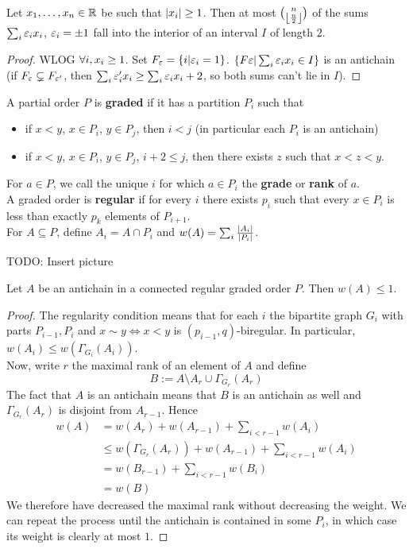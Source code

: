 \documentclass{article}
\begin{document}
\begin{ncor}
  Let $x_1, \dots, x_n \in \mathbb R$ be such that $\left\lvert x_i\right\rvert \ge 1$. Then at most $\binom n{\left\lfloor \frac n 2\right\rfloor}$ of the sums $\sum_i \varepsilon_i x_i$, $\varepsilon_i = \pm 1$ fall into the interior of an interval $I$ of length $2$.
\end{ncor}
\begin{proof}
  WLOG $\forall i, x_i \ge 1$. Set $F_\varepsilon = \{i | \varepsilon_i = 1\}$. $\{F\varepsilon | \sum_i \varepsilon_i x_i \in I\}$ is an antichain (if $F_\varepsilon \subsetneq F_{\varepsilon'}$, then $\sum_i \varepsilon'_i x_i \ge \sum_i \varepsilon_i x_i + 2$, so both sums can't lie in $I$).
\end{proof}

\begin{defi}
  A partial order $P$ is {\bf graded} if it has a partition $P_i$ such that
  \begin{itemize}
    \item if $x < y$, $x \in P_i$, $y \in P_j$, then $i < j$ (in particular each $P_i$ is an antichain)
    \item if $x < y$, $x \in P_i$, $y \in P_j$, $i + 2 \le j$, then there exists $z$ such that $x < z < y$.
  \end{itemize}
  For $a \in P$, we call the unique $i$ for which $a \in P_i$ the {\bf grade} or {\bf rank} of $a$. \\
  A graded order is {\bf regular} if for every $i$ there exists $p_i$ such that every $x \in P_i$ is less than exactly $p_k$ elements of $P_{i + 1}$. \\
  For $A \subseteq P$, define $A_i = A \cap P_i$ and $w(A) = \sum_i \frac{\left\lvert A_i\right\rvert}{\left\lvert P_i\right\rvert}$.
\end{defi}

TODO: Insert picture

\begin{nthm}
  Let $A$ be an antichain in a connected regular graded order $P$. Then $w(A) \le 1$.
\end{nthm}
\begin{proof}
  The regularity condition means that for each $i$ the bipartite graph $G_i$ with parts $P_{i - 1}, P_i$ and $x \sim y \iff x < y$ is $(p_{i - 1}, q)$-biregular. In particular, $w(A_i) \le w(\Gamma_{G_i}(A_i))$. \\
  Now, write $r$ the maximal rank of an element of $A$ and define
  $$B := A \setminus A_r \cup \Gamma_{G_r}(A_r)$$
  The fact that $A$ is an antichain means that $B$ is an antichain as well and $\Gamma_{G_r}(A_r)$ is disjoint from $A_{r - 1}$. Hence
  \begin{align*}
    w(A)
    & = w(A_r) + w(A_{r - 1}) + \sum_{i < r - 1} w(A_i) \\
    & \le w(\Gamma_{G_r}(A_r)) + w(A_{r - 1}) + \sum_{i < r - 1} w(A_i) \\
    & = w(B_{r - 1}) + \sum_{i < r - 1} w(B_i) \\
    & = w(B)
  \end{align*}
  We therefore have decreased the maximal rank without decreasing the weight. We can repeat the process until the antichain is contained in some $P_i$, in which case its weight is clearly at most $1$.
\end{proof}
\end{document}
